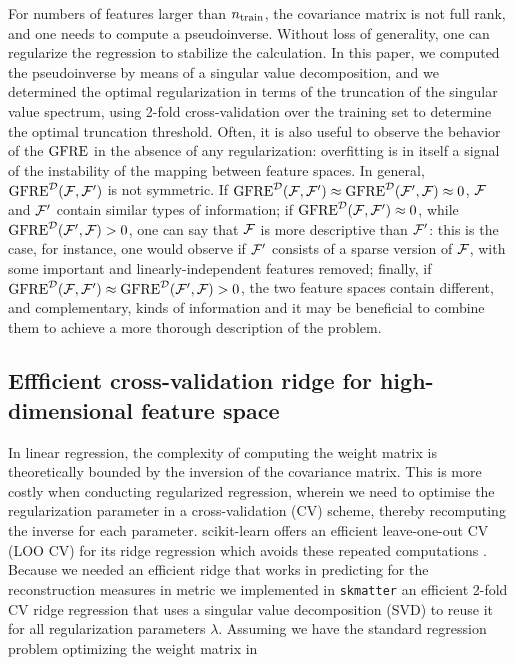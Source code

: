 For numbers of features larger than $n_{\mathrm{train}}$, the covariance matrix is not full rank, and one needs to compute a pseudoinverse. Without loss of generality, one can regularize the regression to stabilize the calculation. In this paper, we computed the pseudoinverse by means of a singular value decomposition, and we determined the optimal regularization in terms of the truncation of the singular value spectrum, using 2-fold cross-validation over the training set to determine the optimal truncation threshold. Often, it is also useful to observe the behavior of the $\operatorname{GFRE}$ in the absence of any regularization: overfitting is in itself a signal of the instability of the mapping between feature spaces.
In general, $\operatorname{GFRE}^{\mathcal{D}}(\mathcal{F},\mathcal{F}^\prime)$ is not symmetric. If $\operatorname{GFRE}^{\mathcal{D}}(\mathcal{F},\mathcal{F}^\prime)\approx\operatorname{GFRE}^{\mathcal{D}}(\mathcal{F}^\prime,\mathcal{F})\approx 0$, $\mathcal{F}$ and $\mathcal{F}^\prime$ contain similar types of information; if $\operatorname{GFRE}^{\mathcal{D}}(\mathcal{F},\mathcal{F}^\prime)\approx 0$, while $\operatorname{GFRE}^{\mathcal{D}}(\mathcal{F}^\prime,\mathcal{F})>0$, one can say that $\mathcal{F}$ is more descriptive than $\mathcal{F}^\prime$: this is the case, for instance, one would observe if $\mathcal{F}^\prime$ consists of a sparse version of $\mathcal{F}$, with some important and linearly-independent features removed; finally, if  $\operatorname{GFRE}^{\mathcal{D}}(\mathcal{F},\mathcal{F}^\prime)\approx\operatorname{GFRE}^{\mathcal{D}}(\mathcal{F}^\prime,\mathcal{F})>0$, the two feature spaces contain different, and complementary, kinds of information and it may be beneficial to combine them to achieve a more thorough description of the problem.

\subsection{Effficient cross-validation ridge for high-dimensional feature space}

In linear regression, the complexity of computing the weight matrix is
theoretically bounded by the inversion of the covariance matrix.  This is
more costly when conducting regularized regression, wherein we need to
optimise the regularization parameter in a cross-validation (CV) scheme,
thereby recomputing the inverse for each parameter.  scikit-learn offers an
efficient leave-one-out CV (LOO CV) for its ridge regression which avoids
these repeated computations \cite{loocv}. Because we needed an efficient ridge that works
in predicting  for the reconstruction measures in  metric
we implemented in \texttt{skmatter} an efficient 2-fold CV ridge regression that uses a singular value decomposition
(SVD) to reuse it for all regularization parameters $\lambda$. Assuming
we have the standard regression problem optimizing the weight matrix in
 
